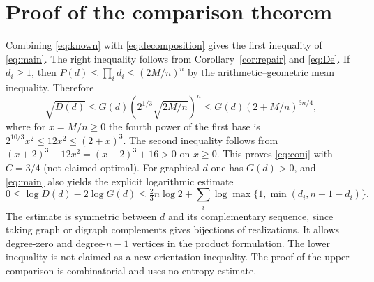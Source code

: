 \documentclass[11pt]{article}
\theoremstyle{remark}\newtheorem{remark}[theorem]{Remark}
\begin{document}
\section{Proof of the comparison theorem}
Combining \eqref{eq:known} with \eqref{eq:decomposition} gives the first inequality of \eqref{eq:main}. The right inequality follows from Corollary~\ref{cor:repair} and \eqref{eq:De}. If $d_i\ge1$, then $P(d)\le\prod_i d_i\le(2M/n)^n$ by the arithmetic--geometric mean inequality. Therefore
\[
 \sqrt{D(d)}\le G(d)\left(2^{1/3}\sqrt{2M/n}\right)^n\le G(d)(2+M/n)^{3n/4},
\]
where for $x=M/n\ge0$ the fourth power of the first base is $2^{10/3}x^2\le12x^2\le(2+x)^3$. The second inequality follows from $(x+2)^3-12x^2=(x-2)^3+16>0$ on $x\ge0$. This proves \eqref{eq:conj} with $C=3/4$ (not claimed optimal). For graphical $d$ one has $G(d)>0$, and \eqref{eq:main} also yields the explicit logarithmic estimate
\[
 0\le\log D(d)-2\log G(d)\le \tfrac23n\log2+\sum_i\log\max\{1,\min(d_i,n-1-d_i)\}.
\]
The estimate is symmetric between $d$ and its complementary sequence, since taking graph or digraph complements gives bijections of realizations. It allows degree-zero and degree-$n-1$ vertices in the product formulation. The lower inequality is not claimed as a new orientation inequality. The proof of the upper comparison is combinatorial and uses no entropy estimate.
\end{document}
